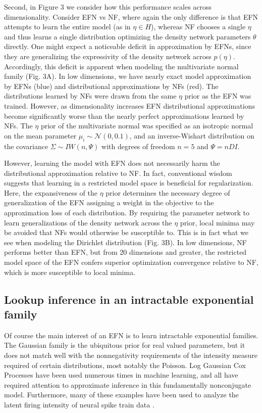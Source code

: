 \documentclass{article}
\begin{document}
Second, in Figure 3 we consider how this performance scales across dimensionality.  Consider EFN vs NF, where again the only difference is that EFN attempts to learn the entire model (as in $\eta \in H$), whereas NF chooses a single $\eta$ and thus learns a single distribution optimizing the density network parameters $\theta$ directly.  One might expect a noticeable deficit in approximation by EFNs, since they are generalizing the expressivity of the density network across $p(\eta)$.  Accordingly, this deficit is apparent when modeling the multivariate normal family (Fig. 3A).  In low dimensions, we have nearly exact model approximation by EFNs (blue) and distributional approximations by NFs (red).  The distributions learned by NFs were drawn from the same $\eta$ prior as the EFN was trained.  However, as dimensionality increases EFN distributional approximations become significantly worse than the nearly perfect approximations learned by NFs.  The $\eta$ prior of the multivariate normal was specified as an isotropic normal on the mean parameter $\mu_i \sim \mathcal{N}(0, 0.1)$, and an inverse-Wishart distribution on the covariance $\Sigma \sim IW(n, \Psi)$ with degrees of freedom $n=5$ and $\Psi = nD I$.

However, learning the model with EFN does not necessarily harm the distributional approximation relative to NF.  In fact, conventional wisdom suggests that learning in a restricted model space is beneficial for regularization.  Here, the expansiveness of the $\eta$ prior determines the necessary degree of generalization of the EFN assigning a weight in the objective to the approximation loss of each distribution.  By requiring the parameter network to learn generalizations of the density network across the $\eta$ prior,  local minima may be avoided that NFs would otherwise be susceptible to.  This is in fact what we see when modeling the Dirichlet distribution (Fig. 3B).  In low dimensions, NF performs better than EFN, but from 20 dimensions and greater, the restricted model space of the EFN confers superior optimization convergence relative to NF, which is more susceptible to local minima.  


\subsection{Lookup inference in an intractable exponential family}

Of course the main interest of an EFN is to learn intractable exponential families.  The Gaussian family is the ubiquitous prior for real valued parameters, but it does not match well with the nonnegativity requirements of the intensity measure required of certain distributions, most notably the Poisson.  Log Gaussian Cox Processes have been used numerous times in machine learning, and all have required attention to approximate inference in this fundamentally nonconjugate model. Furthermore, many of these examples have been used to analyze the latent firing intensity of neural spike train data  \citep{cunningham2008fast,cunningham2008inferring,adams2009tractable,gao2016linear}.
\end{document}
